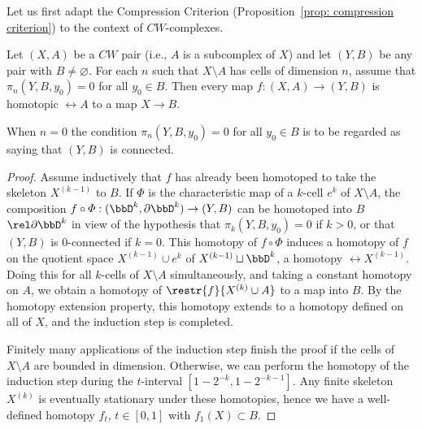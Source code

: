 Let us first adapt the Compression Criterion (Proposition~\ref{prop: compression criterion}) to the context of $CW$-complexes.

\begin{lem}
    Let $(X,A)$ be a $CW$ pair (i.e., $A$ is a subcomplex of $X$) and let $(Y,B)$ be any pair with $B\neq\varnothing$. For each $n$ such that $X\setminus A$ has cells of dimension $n$, assume that $\pi_n(Y,B,y_0)=0$ for all $y_0\in B$. Then every map $f:(X,A)\to (Y,B)$ is homotopic $\rel A$ to a map $X\to B$.

    When $n=0$ the condition $\pi_n(Y,B,y_0)=0$ for all $y_0\in B$ is to be regarded as saying that $(Y,B)$ is connected.
\end{lem}
\begin{proof}
    Assume inductively that $f$ has already been homotoped to take the skeleton $X^{(k-1)}$ to $B$. If $\varPhi$ is the characteristic map of a $k$-cell $e^k$ of $X\setminus A$, the composition $f\circ \varPhi:(\bbD^k,\partial \bbD^k)\to (Y,B)$ can be homotoped into $B$ $\rel \partial \bbD^k$ in view of the hypothesis that $\pi_k(Y,B,y_0)=0$ if $k>0$, or that $(Y,B)$ is $0$-connected if $k=0$. This homotopy of $f\circ\varPhi$ induces a homotopy of $f$ on the quotient space $X^{(k-1)}\cup e^k$ of $X^{(k-1)}\sqcup \bbD^k$, a homotopy $\rel X^{(k-1)}$. Doing this for all $k$-cells of $X\setminus A$ simultaneously, and taking a constant homotopy on $A$, we obtain a homotopy of $\restr{f}{X^{(k)}\cup A}$ to a map into $B$. By the homotopy extension property, this homotopy extends to a homotopy defined on all of $X$, and the induction step is completed.

    Finitely many applications of the induction step finish the proof if the cells of $X\setminus A$ are bounded in dimension. Otherwise, we can perform the homotopy of the induction step during the $t$-interval $[1-2^{-k},1-2^{-k-1}]$. Any finite skeleton $X^{(k)}$ is eventually stationary under these homotopies, hence we have a well-defined homotopy $f_t$, $t\in [0,1]$ with $f_1(X)\subset B$.
\end{proof}


